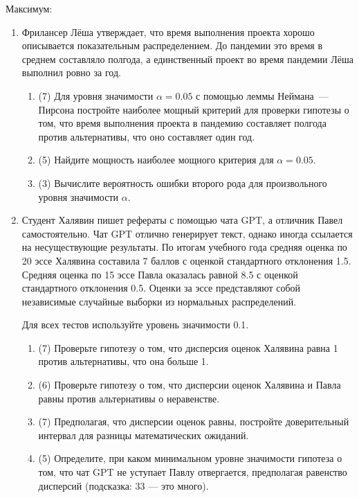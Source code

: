 Максимум:

\begin{enumerate}
\item Фрилансер Лёша утверждает, что время выполнения проекта хорошо описывается показательным распределением. 
До пандемии это время в среднем составляло полгода, а единственный проект во время пандемии Лёша выполнил ровно за год. 

\begin{enumerate}
\item (7) Для уровня значимости $\alpha=0.05$ с помощью леммы Неймана~— Пирсона постройте наиболее мощный критерий для проверки гипотезы о том, 
что время выполнения проекта в пандемию составляет полгода против альтернативы, что оно составляет один год.
\item (5) Найдите мощность наиболее мощного критерия для $\alpha=0.05$.
\item (3) Вычислите вероятность ошибки второго рода для произвольного уровня значимости $\alpha$.
\end{enumerate}

\item 
Студент Халявин пишет рефераты с помощью чата GPT, а отличник Павел самостоятельно. 
Чат GPT отлично генерирует текст, однако иногда ссылается на несуществующие результаты. 
По итогам учебного года средняя оценка по 20 эссе Халявина составила 7 баллов с оценкой стандартного отклонения 1.5.
Средняя оценка по 15 эссе Павла оказалась равной 8.5 с оценкой стандартного отклонения 0.5. 
Оценки за эссе представляют собой независимые случайные выборки из нормальных распределений.

Для всех тестов используйте уровень значимости 0.1.

\begin{enumerate}
\item (7) Проверьте гипотезу о том, что дисперсия оценок Халявина равна 1 против альтернативы, что она больше 1.
\item (6) Проверьте гипотезу о том, что дисперсии оценок Халявина и Павла равны против альтернативы о неравенстве.
\item (7) Предполагая, что дисперсии оценок равны, постройте доверительный интервал для разницы математических ожиданий.
\item (5) Определите, при каком минимальном уровне значимости гипотеза о том, что чат GPT не уступает Павлу отвергается, предполагая равенство дисперсий (подсказка: 33 — это много).
\end{enumerate}



\end{enumerate}
